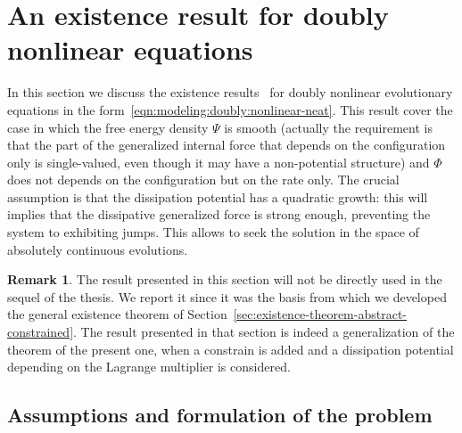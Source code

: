 \documentclass[a4paper,10pt,oneside]{amsbook}
\numberwithin{section}{chapter}
\numberwithin{equation}{chapter}
\theoremstyle{definition}
\newtheorem{rmk}[prop]{Remark}
\begin{document}
\section{An existence result for doubly nonlinear equations}
\label{sec:roubickeck}

In this section we discuss the existence results~\cite[Proposition 11.1]{roubicek-pde} for doubly nonlinear evolutionary equations in the form~\eqref{eqn:modeling:doubly:nonlinear-neat}. This result cover the case in which the free energy density $\Psi$ is smooth (actually the requirement is that the part of the generalized internal force that depends on the configuration only is single-valued, even though it may have a non-potential structure) and $\Phi$ does not depends on the configuration but on the rate only. The crucial assumption is that the dissipation potential has a quadratic growth: this will implies that the dissipative generalized force is strong enough, preventing the system to exhibiting jumps. This allows to seek the solution in the space of absolutely continuous evolutions.

\begin{rmk}
The result presented in this section will not be directly used in the sequel of the thesis. We report it since it was the basis from which we developed the general existence theorem of Section~\ref{sec:existence-theorem-abstract-constrained}. The result presented in that section is indeed a generalization of the theorem of the present one, when a constrain is added and a dissipation potential depending on the Lagrange multiplier is considered.
\end{rmk}

\subsection{Assumptions and formulation of the problem}
\end{document}
